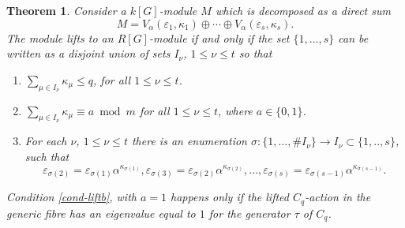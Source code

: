 \documentclass[11pt,letterpaper]{amsart}
\newtheorem{theorem}{Theorem}
\theoremstyle{definition}
\newcommand{\Z}{\mathbb{Z}}
\renewcommand{\mod}{\bmod}
\begin{document}



\begin{theorem}
\label{cond-lift}
Consider a $k[G]$-module $M$ which is decomposed as a direct sum 
\[
  M= V_{\alpha}(\varepsilon_1,\kappa_1) \oplus \cdots \oplus V_{\alpha}(\varepsilon_s,\kappa_s). 
\]
The module lifts to an $R[G]$-module if and only if 
the set $\{1,\ldots,s\}$ can be written as a disjoint union of sets $I_\nu$, $1\leq \nu \leq t$ so that

\begin{enumerate}[label=\alph*.]
\item \label{cond-lifta}$\sum_{\mu \in I_\nu} \kappa_\mu \leq q$, for all $1\leq \nu \leq t$. 
\item \label{cond-liftb}$\sum_{\mu \in I_\nu} \kappa_\mu\equiv a \mod m$  for all $1\leq \nu \leq t$, where $a\in \{0,1\}$. 
\item \label{cond-liftc} 
For each $\nu$, $1\leq \nu \leq t$ there is an enumeration $\sigma: \{1,\ldots,\#I_\nu\} \rightarrow I_\nu\subset \{1,..,s\}$,
such that 
\[
  \varepsilon_{\sigma(2)}= \varepsilon_{\sigma(1)} \alpha^{\kappa_{\sigma(1)}},
  \varepsilon_{\sigma(3)}= \varepsilon_{\sigma(2)} \alpha^{\kappa_{\sigma(2)}},\ldots,
  \varepsilon_{\sigma(s)}= \varepsilon_{\sigma(s-1)} \alpha^{\kappa_{\sigma(s-1)}}.
\]
\end{enumerate}
Condition \ref{cond-liftb}, with $a=1$ happens only if the lifted $C_q$-action in the generic fibre has an eigenvalue equal to $1$ for the generator $\tau$ of $C_q$.   
\end{theorem}
\end{document}

